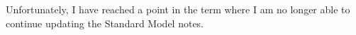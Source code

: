 Unfortunately, I have reached a point in the term where I am no longer able to continue updating the Standard Model notes. 